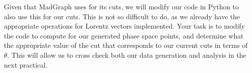 Given that MadGraph uses  for its cuts, we will modify our code in Python to also use this for our cuts. This is not so difficult to do, as we already have the appropriate operations for Lorentz vectors implemented. Your task is to modify the code to compute  for our generated phase space points, and determine what the appropriate value of the  cut that corresponds to our current cuts in terms of $\theta$. This will allow us to cross check both our data generation and analysis in the next practical. 













